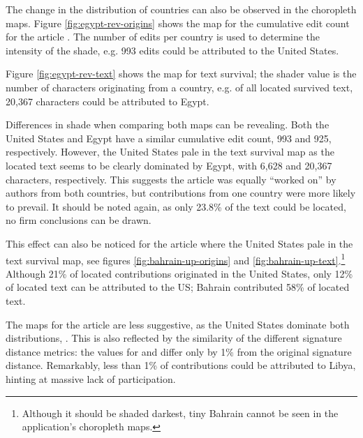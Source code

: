 The change in the distribution of countries can also be observed in the choropleth maps. 
Figure \ref{fig:egypt-rev-origins} shows the map for the cumulative edit count for the article .
The number of edits per country is used to determine the intensity of the shade, e.g. 993 edits could be attributed to the United States. 

Figure \ref{fig:egypt-rev-text} shows the map for text survival; the shader value is the number of characters originating from a country, e.g. of all located survived text, 20,367 characters could be attributed to Egypt.

Differences in shade when comparing both maps can be revealing.
Both the United States and Egypt have a similar cumulative edit count, 993 and 925, respectively.
However, the United States pale in the text survival map as the located text seems to be clearly dominated by Egypt, with 6,628 and 20,367 characters, respectively.
This suggests the article was equally ``worked on'' by authors from both countries, but contributions from one country were more likely to prevail.
It should be noted again, as only 23.8\% of the text could be located, no firm conclusions can be drawn.



This effect can also be noticed for the article  where the United States pale in the text survival map, see figures \ref{fig:bahrain-up-origins} and \ref{fig:bahrain-up-text}.\footnote{Although it should be shaded darkest, tiny Bahrain cannot be seen in the application's choropleth maps.}
Although 21\% of located contributions originated in the United States, only 12\% of located text can be attributed to the US; Bahrain contributed 58\% of located text.

The maps for the article  are less suggestive, as the United States dominate both distributions, .
This is also reflected by the similarity of the different signature distance metrics: the values for  and  differ only by 1\% from the original signature distance.
Remarkably, less than 1\% of contributions could be attributed to Libya, hinting at massive lack of participation.

